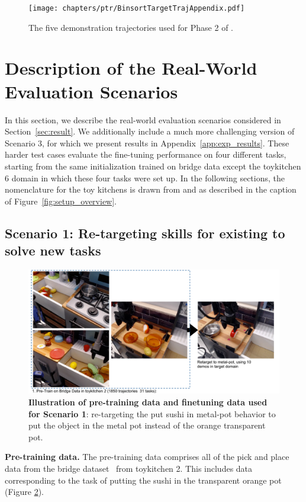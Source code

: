 \documentclass[../thesis.tex]{subfiles}
\begin{document}
\begin{figure}
\centering
  \texttt{[image: chapters/ptr/BinsortTargetTrajAppendix.pdf]}
  \caption{\label{fig:app_targ_rollout_sim} \footnotesize {The five demonstration trajectories used for Phase 2 of \ptrmethodname.}}
\end{figure}

\section{Description of the Real-World Evaluation Scenarios}
\label{app:tasks}
In this section, we describe the real-world evaluation scenarios considered in Section~\ref{sec:result}. We additionally include a much more challenging version of Scenario 3, for which we present results in Appendix~\ref{app:exp_results}. These harder test cases evaluate the fine-tuning performance on four different tasks, starting from the same initialization trained on bridge data except the toykitchen 6 domain in which these four tasks were set up. In the following sections, the nomenclature for the toy kitchens is drawn from \citet{ebert2021bridge} and as described in the caption of Figure~\ref{fig:setup_overview}.

\subsection{Scenario 1: Re-targeting skills for existing to solve new tasks}

\begin{figure}
\centering
  \includegraphics[width=0.83\linewidth]{chapters/ptr/scenario1_overview.pdf}
  \caption{\footnotesize \textbf{Illustration of pre-training data and finetuning data used for Scenario 1}: re-targeting the put sushi in metal-pot behavior to put the object in the metal pot instead of the orange transparent pot.}
  \label{fig:retargeting_setup}
\end{figure}


\textbf{Pre-training data.} The pre-training data comprises all of the pick and place data from the bridge dataset~\citep{ebert2021bridge} from toykitchen 2. This includes data corresponding to the task of putting the sushi in the transparent orange pot (Figure \ref{fig:retargeting_setup}).  
\end{document}
